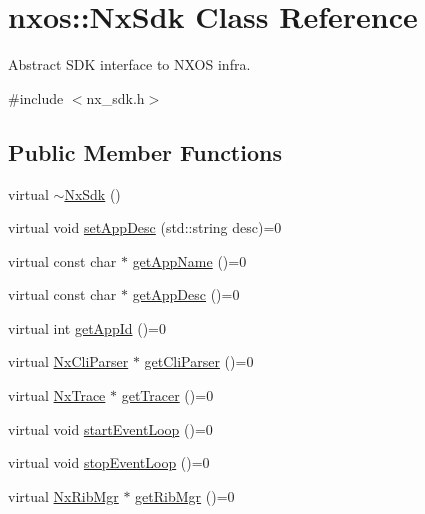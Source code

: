 \hypertarget{classnxos_1_1_nx_sdk}{}\section{nxos\+:\+:Nx\+Sdk Class Reference}
\label{classnxos_1_1_nx_sdk}


Abstract S\+DK interface to N\+X\+OS infra.  




{\ttfamily \#include $<$nx\+\_\+sdk.\+h$>$}

\subsection*{Public Member Functions}
\begin{DoxyCompactItemize}
\item 
virtual \mbox{\hyperlink{classnxos_1_1_nx_sdk_a6b5028045019af4be6c8356ec0fdaff9}{$\sim$\+Nx\+Sdk}} ()
\item 
virtual void \mbox{\hyperlink{classnxos_1_1_nx_sdk_a2c6007a383114285951b2d2a062dacec}{set\+App\+Desc}} (std\+::string desc)=0
\item 
virtual const char $\ast$ \mbox{\hyperlink{classnxos_1_1_nx_sdk_a9ba7da2cd8cb4f82438135ee651efdb0}{get\+App\+Name}} ()=0
\item 
virtual const char $\ast$ \mbox{\hyperlink{classnxos_1_1_nx_sdk_ad6964fa8ee52a8b0a22c27abdcf871e3}{get\+App\+Desc}} ()=0
\item 
virtual int \mbox{\hyperlink{classnxos_1_1_nx_sdk_ac82af6d262439275f27c745082bf3fd7}{get\+App\+Id}} ()=0
\item 
virtual \mbox{\hyperlink{classnxos_1_1_nx_cli_parser}{Nx\+Cli\+Parser}} $\ast$ \mbox{\hyperlink{classnxos_1_1_nx_sdk_a98bcb70d1bf60e38b41eacdf0a72dc89}{get\+Cli\+Parser}} ()=0
\item 
virtual \mbox{\hyperlink{classnxos_1_1_nx_trace}{Nx\+Trace}} $\ast$ \mbox{\hyperlink{classnxos_1_1_nx_sdk_ad2c729bd12d1b9f4bf06f4b70fe28347}{get\+Tracer}} ()=0
\item 
virtual void \mbox{\hyperlink{classnxos_1_1_nx_sdk_a75ca70643fe325ddf0eea62c1f8c4cc8}{start\+Event\+Loop}} ()=0
\item 
virtual void \mbox{\hyperlink{classnxos_1_1_nx_sdk_adc80e6f244a7cbc050f9dacbc8018315}{stop\+Event\+Loop}} ()=0
\item 
virtual \mbox{\hyperlink{classnxos_1_1_nx_rib_mgr}{Nx\+Rib\+Mgr}} $\ast$ \mbox{\hyperlink{classnxos_1_1_nx_sdk_a3cdb42126b1132cf9aa00426a8d5d428}{get\+Rib\+Mgr}} ()=0

\end{DoxyCompactItemize}
